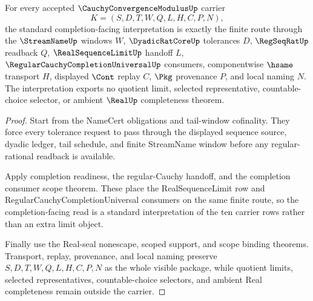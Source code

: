 \begin{theorem}
\label{thm:cauchy-convergence-modulus-mature-package}
For every accepted $\CauchyConvergenceModulusUp$ carrier
$$
K=(S,D,T,W,Q,L,H,C,P,N),
$$
the standard completion-facing interpretation is exactly the finite route through the $\StreamNameUp$ windows $W$, $\DyadicRatCoreUp$ tolerances $D$, $\RegSeqRatUp$ readback $Q$, $\RealSequenceLimitUp$ handoff $L$, $\RegularCauchyCompletionUniversalUp$ consumers, componentwise $\hsame$ transport $H$, displayed $\Cont$ replay $C$, $\Pkg$ provenance $P$, and local naming $N$. The interpretation exports no quotient limit, selected representative, countable-choice selector, or ambient $\RealUp$ completeness theorem.
\end{theorem}
\begin{proof}
Start from the NameCert obligations and tail-window cofinality. They force every tolerance request to pass through the displayed sequence source, dyadic ledger, tail schedule, and finite StreamName window before any regular-rational readback is available.

Apply completion readiness, the regular-Cauchy handoff, and the completion consumer scope theorem. These place the RealSequenceLimit row and RegularCauchyCompletionUniversal consumers on the same finite route, so the completion-facing read is a standard interpretation of the ten carrier rows rather than an extra limit object.

Finally use the Real-seal nonescape, scoped support, and scope binding theorems. Transport, replay, provenance, and local naming preserve $S,D,T,W,Q,L,H,C,P,N$ as the whole visible package, while quotient limits, selected representatives, countable-choice selectors, and ambient Real completeness remain outside the carrier.
\end{proof}



